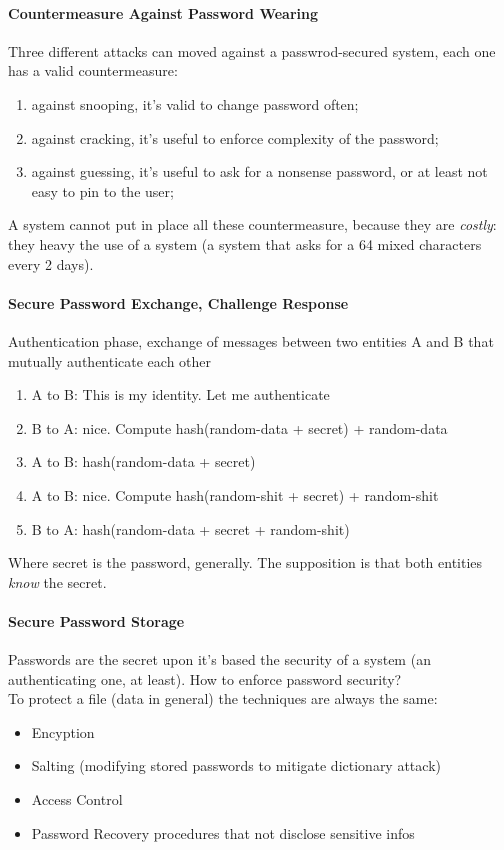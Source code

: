 \documentclass{article}
\begin{document}
					\paragraph{Countermeasure Against Password Wearing}
						Three different attacks can moved against a passwrod-secured system, each one has a valid countermeasure:
						\begin{enumerate}
							\item against snooping, it's valid to change password often;
							\item against cracking, it's useful to enforce complexity of the password;
							\item against guessing, it's useful to ask for a nonsense password, or at least not easy to pin to the user;
						\end{enumerate}
						A system cannot put in place all these countermeasure, because they are \emph{costly}: they heavy the use of a system (a system that asks for a 64 mixed characters every 2 days).
						
					\paragraph{Secure Password Exchange, Challenge Response}
						Authentication phase, exchange of messages between two entities A and B that mutually authenticate each other
						\begin{enumerate}
							\item A to B: This is my identity. Let me authenticate
							\item B to A: nice. Compute hash(random-data + secret) + random-data
							\item A to B: hash(random-data + secret)
							\item A to B: nice. Compute hash(random-shit + secret) + random-shit
							\item B to A: hash(random-data + secret + random-shit)
						\end{enumerate}
						Where secret is the password, generally. The supposition is that both entities \emph{know} the secret.
						
					\paragraph{Secure Password Storage}
						Passwords are the secret upon it's based the security of a system (an authenticating one, at least). How to enforce password security?\\
						To protect a file (data in general) the techniques are always the same: 
						\begin{itemize}
							\item Encyption
							\item Salting (modifying stored passwords to mitigate dictionary attack)
							\item Access Control
							\item Password Recovery procedures that not disclose sensitive infos
						\end{itemize}
				
\end{document}
